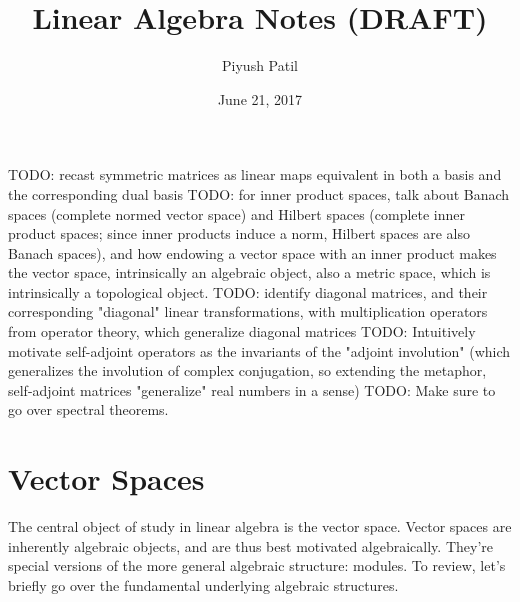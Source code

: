 \documentclass{article}
\begin{document}
\title{Linear Algebra Notes (DRAFT)}
\author{Piyush Patil}
\date{June 21, 2017}
\maketitle

TODO: recast symmetric matrices as linear maps equivalent in both a basis and the corresponding dual basis
TODO: for inner product spaces, talk about Banach spaces (complete normed vector space) and Hilbert spaces (complete inner product spaces; since inner products induce a norm, Hilbert spaces are also Banach spaces), and how endowing a vector space with an inner product makes the vector space, intrinsically an algebraic object, also a metric space, which is intrinsically a topological object.
TODO: identify diagonal matrices, and their corresponding "diagonal" linear transformations, with multiplication operators from operator theory, which generalize diagonal matrices
TODO: Intuitively motivate self-adjoint operators as the invariants of the "adjoint involution" (which generalizes the involution of complex conjugation, so extending the metaphor, self-adjoint matrices "generalize" real numbers in a sense)
TODO: Make sure to go over spectral theorems.

\section{Vector Spaces}

The central object of study in linear algebra is the vector space. Vector spaces are inherently algebraic objects, and are thus best motivated algebraically. They're special versions of the more general algebraic structure: modules. To review, let's briefly go over the fundamental underlying algebraic structures.
\end{document}
